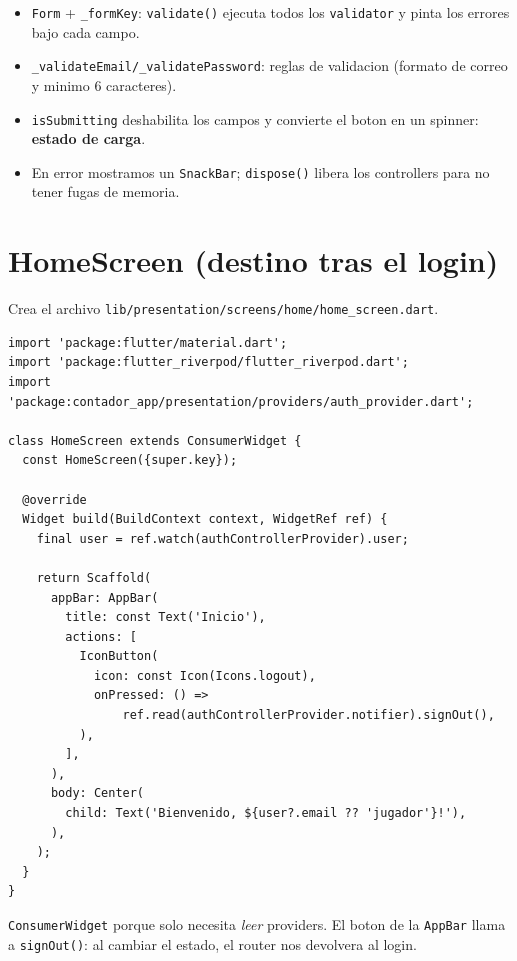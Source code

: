 \documentclass[11pt,a4paper,oneside]{book}
\newcommand{\file}[1]{\texttt{\textcolor{brandDark}{#1}}}
\begin{document}
\begin{whatbox}
\begin{itemize}
  \item \texttt{Form} + \texttt{\_formKey}: \texttt{validate()} ejecuta todos los
        \texttt{validator} y pinta los errores bajo cada campo.
  \item \texttt{\_validateEmail/\_validatePassword}: reglas de validacion (formato de
        correo y minimo 6 caracteres).
  \item \texttt{isSubmitting} deshabilita los campos y convierte el boton en un
        spinner: \textbf{estado de carga}.
  \item En error mostramos un \texttt{SnackBar}; \texttt{dispose()} libera los
        controllers para no tener fugas de memoria.
\end{itemize}
\end{whatbox}

\section{HomeScreen (destino tras el login)}
\begin{wherebox}
Crea el archivo \file{lib/presentation/screens/home/home\_screen.dart}.
\end{wherebox}

\begin{lstlisting}
import 'package:flutter/material.dart';
import 'package:flutter_riverpod/flutter_riverpod.dart';
import 'package:contador_app/presentation/providers/auth_provider.dart';

class HomeScreen extends ConsumerWidget {
  const HomeScreen({super.key});

  @override
  Widget build(BuildContext context, WidgetRef ref) {
    final user = ref.watch(authControllerProvider).user;

    return Scaffold(
      appBar: AppBar(
        title: const Text('Inicio'),
        actions: [
          IconButton(
            icon: const Icon(Icons.logout),
            onPressed: () =>
                ref.read(authControllerProvider.notifier).signOut(),
          ),
        ],
      ),
      body: Center(
        child: Text('Bienvenido, ${user?.email ?? 'jugador'}!'),
      ),
    );
  }
}
\end{lstlisting}

\begin{whatbox}
\texttt{ConsumerWidget} porque solo necesita \emph{leer} providers. El boton de la
\texttt{AppBar} llama a \texttt{signOut()}: al cambiar el estado, el router nos
devolvera al login.
\end{whatbox}
\end{document}
